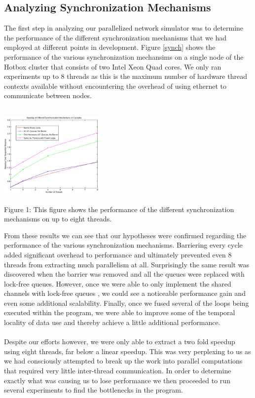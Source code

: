 \documentclass{article}
\begin{document}
\begin{multicols}{2}
\subsection{Analyzing Synchronization Mechanisms}
The first step in analyzing our parallelized network simulator was to
determine the performance of the different synchronization mechanisms that
we had employed at different points in development.  Figure \ref{synch}
shows the performance of the various synchronization mechansims on a
single node of the Hotbox cluster that consists of two Intel Xeon Quad
cores.  We only ran experiments up to 8 threads as this is the maximum
number of hardware thread contexts available without encountering the
overhead of using ethernet to communicate between nodes.\\
\begin{center}
\includegraphics[width=2in,height=2in]{synch.eps} \\
\small{Figure 1: This figure shows the performance of the different
synchronization mechanisms on up to eight threads.}
\end{center}
From these results we can see that our hypotheses were confirmed regarding
the performance of the various synchronization mechanisms.  Barriering
every cycle added significant overhead to performance and ultimately
prevented even 8 threads from extracting much parallelism at all.
Surprisingly the same result was discovered when the barrier was removed and
all the queues were replaced with lock-free queues.  However, once we were
able to only implement the shared channels with lock-free queues , we could see a noticeable performance gain and even some
additional scalability.  Finally, once we fused several of the loops being
executed within the program, we were able to improve some of the temporal
locality of data use and thereby achieve a little additional
performance.\\
~\\
Despite our efforts however, we were only able to extract a two fold
speedup using eight threads, far below a linear speedup.  This was very
perplexing to us as we had consciously attempted to break up the work into
parallel computations that required very little inter-thread
communication.  In order to determine exactly what was causing us to lose
performance we then proceeded to run several experiments to find the
bottlenecks in the program.


\end{multicols}
\end{document}
